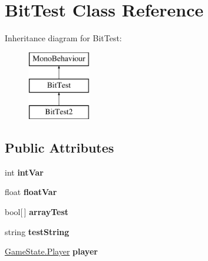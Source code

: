 \hypertarget{class_bit_test}{\section{Bit\-Test Class Reference}
\label{class_bit_test}
}
Inheritance diagram for Bit\-Test\-:\begin{figure}[H]
\begin{center}
\leavevmode
\includegraphics[height=3.000000cm]{class_bit_test}
\end{center}
\end{figure}
\subsection*{Public Attributes}
\begin{DoxyCompactItemize}
\item 
\hypertarget{class_bit_test_a229c089c4bf0f320defa8af85362ca97}{int {\bfseries int\-Var}}\label{class_bit_test_a229c089c4bf0f320defa8af85362ca97}

\item 
\hypertarget{class_bit_test_aff8f50b12ea462699b258dd4fe7da1e7}{float {\bfseries float\-Var}}\label{class_bit_test_aff8f50b12ea462699b258dd4fe7da1e7}

\item 
\hypertarget{class_bit_test_a92242e855e7f4507b804a77ae6221166}{bool\mbox{[}$\,$\mbox{]} {\bfseries array\-Test}}\label{class_bit_test_a92242e855e7f4507b804a77ae6221166}

\item 
\hypertarget{class_bit_test_afca10f624e8a1ad35b1272da122f5884}{string {\bfseries test\-String}}\label{class_bit_test_afca10f624e8a1ad35b1272da122f5884}

\item 
\hypertarget{class_bit_test_ad10d5f7bafa4471c42dff93a411c46bf}{\hyperlink{struct_game_state_1_1_player}{Game\-State.\-Player} {\bfseries player}}\label{class_bit_test_ad10d5f7bafa4471c42dff93a411c46bf}

\end{DoxyCompactItemize}
